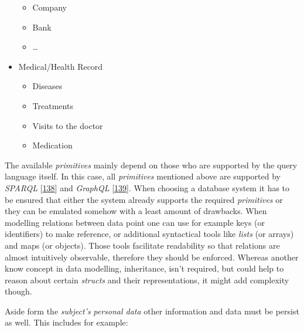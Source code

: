 \documentclass[12pt,english,a4paper,titlepage,cleardoublepage=empty,dottedtoc]{report}
\providecommand{\tightlist}{%
  \setlength{\itemsep}{0pt}\setlength{\parskip}{0pt}}
\begin{document}
\begin{itemize}
  \begin{itemize}
  \tightlist
  \item
    Company
  \item
    Bank
  \item
    \ldots{}
  \end{itemize}
\item
  Medical/Health Record

  \begin{itemize}
  \tightlist
  \item
    Diseases
  \item
    Treatments
  \item
    Visits to the doctor
  \item
    Medication
  \end{itemize}
\end{itemize}

The available \emph{primitives} mainly depend on those who are supported
by the query language itself. In this case, all \emph{primitives}
mentioned above are supported by \emph{SPARQL}
{[}\protect\hyperlink{ref-web_spec_xml_types}{138}{]} and \emph{GraphQL}
{[}\protect\hyperlink{ref-web_spec_graphql_types}{139}{]}. When choosing
a database system it has to be ensured that either the system already
supports the required \emph{primitives} or they can be emulated somehow
with a least amount of drawbacks. When modelling relations between data
point one can use for example keys (or identifiers) to make reference,
or additional syntactical tools like \emph{lists} (or arrays) and maps
(or objects). Those tools facilitate readability so that relations are
almost intuitively observable, therefore they should be enforced.
Whereas another know concept in data modelling, inheritance, isn't
required, but could help to reason about certain \emph{structs} and
their representations, it might add complexity though.

Aside form the \emph{subject's} \emph{personal data} other information
and data must be persist as well. This includes for example:
\end{document}
